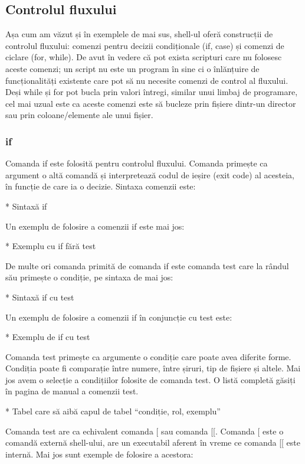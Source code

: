 \subsection{Controlul fluxului}
\label{sec:script-func-flux}

Așa cum am văzut și în exemplele de mai sus, shell-ul oferă construcții de
controlul fluxului: comenzi pentru decizii condiționale (if, case) și comenzi de
ciclare (for, while). De avut în vedere că pot exista scripturi care nu folosesc
aceste comenzi; un script nu este un program în sine ci o înlănțuire de
funcționalități existente care pot să nu necesite comenzi de control al
fluxului. Deși while și for pot bucla prin valori întregi, similar unui limbaj
de programare, cel mai uzual este ca aceste comenzi este să bucleze prin fișiere
dintr-un director sau prin coloane/elemente ale unui fișier.

\subsubsection{if}
\label{sec:script-func-flux-if}

Comanda if este folosită pentru controlul fluxului. Comanda primește ca argument
o altă comandă și interpretează codul de ieșire (exit code) al acesteia, în
funcție de care ia o decizie. Sintaxa comenzii este:

* Sintaxă if

Un exemplu de folosire a comenzii if este mai jos:

* Exemplu cu if fără test

De multe ori comanda primită de comanda if este comanda test care la rândul său
primește o condiție, pe sintaxa de mai jos:

* Sintaxă if cu test

Un exemplu de folosire a comenzii if în conjuncție cu test este:

* Exemplu de if cu test

Comanda test primește ca argumente o condiție care poate avea diferite forme.
Condiția poate fi comparație între numere, între șiruri, tip de fișiere și
altele. Mai jos avem o selecție a condițiilor folosite de comanda test. O listă
completă găsiți în pagina de manual a comenzii test.

* Tabel care să aibă capul de tabel “condiție, rol, exemplu”

Comanda test are ca echivalent comanda [ sau comanda [[. Comanda [ este o
comandă externă shell-ului, are un executabil aferent în vreme ce comanda [[
este internă. Mai jos sunt exemple de folosire a acestora:

